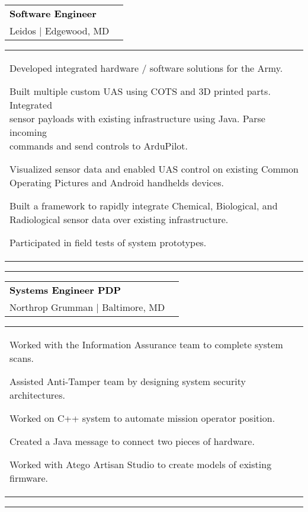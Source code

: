 \documentclass[10pt,A4,english]{article}
\newcommand{\mpwidth}{\linewidth-\fboxsep-\fboxsep}
\newcommand{\cvlist}[1] {
	\begin{itemize}{#1}\end{itemize}
}
\newcommand{\cvproject}[2] {
	\cvtext{\textcolor{black}{\textit{#1}}}
	\cvlist{#2}
}
\newcommand{\cvtext}[1] {
	\begin{tabular*}{1\mpwidth}{p{0.98\mpwidth}}
		\parbox{1\mpwidth}{#1}
	\end{tabular*}
}
\newcommand{\cvevent}[5] {

	\parbox{\mpwidth}{

		\begin{tabular*}{1\mpwidth}{p{0.66\mpwidth}  r}

		\textcolor{black}{\textbf{#2}} & \colorbox{accentcol}{\makebox[0.32\mpwidth]{\textcolor{white}{\textbf{#1}}}} \\
		\textcolor{maincol}{#3} | \textcolor{maincol}{#4} & \\

        \end{tabular*}
		\vspace{6pt}

		\cvtext{\cvlist{#5}}

		\vspace{6pt}

		\textcolor{accentcol}{ \rule{0.66\textwidth}{1.5pt} }
		\vspace{-4pt}
	}
}
\begin{document}
\begin{paracol}{2}
\begin{rightcolumn}
\cvevent
{11/2016 - 06/2021}
{Software Engineer}
{Leidos}
{Edgewood, MD}
{
	\item Developed integrated hardware / software solutions for the Army.
	\item Built multiple custom UAS using COTS and 3D printed parts. Integrated \\
	      sensor payloads with existing infrastructure using Java. Parse incoming \\
		  commands and send controls to ArduPilot.
	\item Visualized sensor data and enabled UAS control on existing Common \\
	      Operating Pictures and Android handhelds devices.
	\item Built a framework to rapidly integrate Chemical, Biological, and \\
          Radiological sensor data over existing infrastructure.
    \item Participated in field tests of system prototypes.
}

\cvevent
{07/2015 - 11/2016}
{Systems Engineer PDP}
{Northrop Grumman}
{Baltimore, MD}
{
	\item Worked with the Information Assurance team to complete system scans.
	\item Assisted Anti-Tamper team by designing system security architectures.
	\item Worked on C++ system to automate mission operator position.
	\item Created a Java message to connect two pieces of hardware.
	\item Worked with Atego Artisan Studio to create models of existing firmware.
}




\end{rightcolumn}
\end{paracol}
\end{document}
